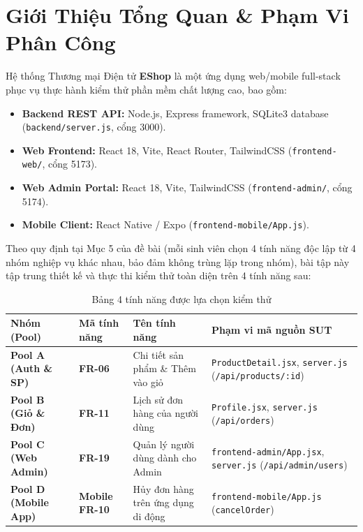\documentclass[11pt,a4paper]{article}
\begin{document}
\tableofcontents
\newpage

\section{Giới Thiệu Tổng Quan \& Phạm Vi Phân Công}

Hệ thống Thương mại Điện tử \textbf{EShop} là một ứng dụng web/mobile full-stack phục vụ thực hành kiểm thử phần mềm chất lượng cao, bao gồm:
\begin{itemize}
    \item \textbf{Backend REST API:} Node.js, Express framework, SQLite3 database (\texttt{backend/server.js}, cổng 3000).
    \item \textbf{Web Frontend:} React 18, Vite, React Router, TailwindCSS (\texttt{frontend-web/}, cổng 5173).
    \item \textbf{Web Admin Portal:} React 18, Vite, TailwindCSS (\texttt{frontend-admin/}, cổng 5174).
    \item \textbf{Mobile Client:} React Native / Expo (\texttt{frontend-mobile/App.js}).
\end{itemize}

Theo quy định tại Mục 5 của đề bài (mỗi sinh viên chọn 4 tính năng độc lập từ 4 nhóm nghiệp vụ khác nhau, bảo đảm không trùng lặp trong nhóm), bài tập này tập trung thiết kế và thực thi kiểm thử toàn diện trên 4 tính năng sau:

\begin{table}[h]
\centering
\small
\begin{tabularx}{\textwidth}{L{3.2cm} L{2.2cm} L{4.5cm} Y}
\toprule
\textbf{Nhóm (Pool)} & \textbf{Mã tính năng} & \textbf{Tên tính năng} & \textbf{Phạm vi mã nguồn SUT} \\
\midrule
\textbf{Pool A (Auth \& SP)} & \textbf{FR-06} & Chi tiết sản phẩm \& Thêm vào giỏ & \texttt{ProductDetail.jsx}, \texttt{server.js} (\texttt{/api/products/:id}) \\
\textbf{Pool B (Giỏ \& Đơn)} & \textbf{FR-11} & Lịch sử đơn hàng của người dùng & \texttt{Profile.jsx}, \texttt{server.js} (\texttt{/api/orders}) \\
\textbf{Pool C (Web Admin)} & \textbf{FR-19} & Quản lý người dùng dành cho Admin & \texttt{frontend-admin/App.jsx}, \texttt{server.js} (\texttt{/api/admin/users}) \\
\textbf{Pool D (Mobile App)} & \textbf{Mobile FR-10} & Hủy đơn hàng trên ứng dụng di động & \texttt{frontend-mobile/App.js} (\texttt{cancelOrder}) \\
\bottomrule
\end{tabularx}
\caption{Bảng 4 tính năng được lựa chọn kiểm thử}
\end{table}
\end{document}

